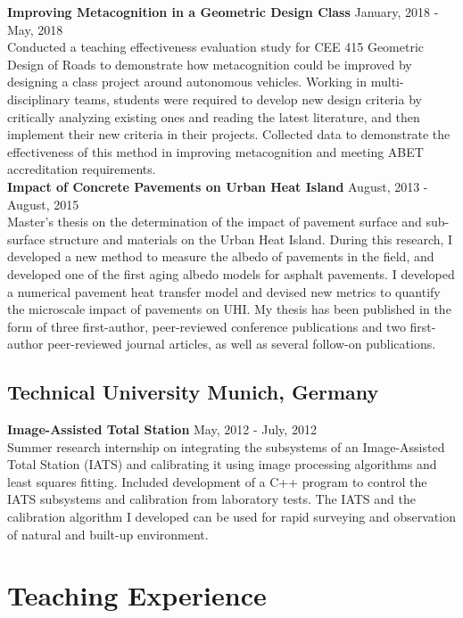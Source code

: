 \documentclass[12pt]{article}
\begin{document}
\textbf{Improving Metacognition in a Geometric Design Class} \hfill January, 2018 - May, 2018\\
Conducted a teaching effectiveness evaluation study for CEE 415 Geometric Design of Roads to demonstrate how metacognition could be improved by designing a class project around autonomous vehicles. Working in multi-disciplinary teams, students were required to develop new design criteria by critically analyzing existing ones and reading the latest literature, and then implement their new criteria in their projects. Collected data to demonstrate the effectiveness of this method in improving metacognition and meeting ABET accreditation requirements. \\

\textbf{Impact of Concrete Pavements on Urban Heat Island} \hfill August, 2013 - August, 2015 \\
Master's thesis on the determination of the impact of pavement surface and sub-surface structure and materials on the Urban Heat Island. During this research, I developed a new method to measure the albedo of pavements in the field, and developed one of the first aging albedo models for asphalt pavements. I developed a numerical pavement heat transfer model and devised new metrics to quantify the microscale impact of pavements on UHI. My thesis has been published in the form of three first-author, peer-reviewed conference publications and two first-author peer-reviewed journal articles, as well as several follow-on publications.\\

\subsection*{Technical University Munich, Germany}
\textbf{Image-Assisted Total Station} \hfill May, 2012 - July, 2012 \\
Summer research internship on integrating the subsystems of an Image-Assisted Total Station (IATS) and calibrating it using image processing algorithms and least squares fitting. Included development of a C++ program to control the IATS subsystems and calibration from laboratory tests. The IATS and the calibration algorithm I developed can be used for rapid surveying and observation of natural and built-up environment.\\

\section*{Teaching Experience}
\end{document}
